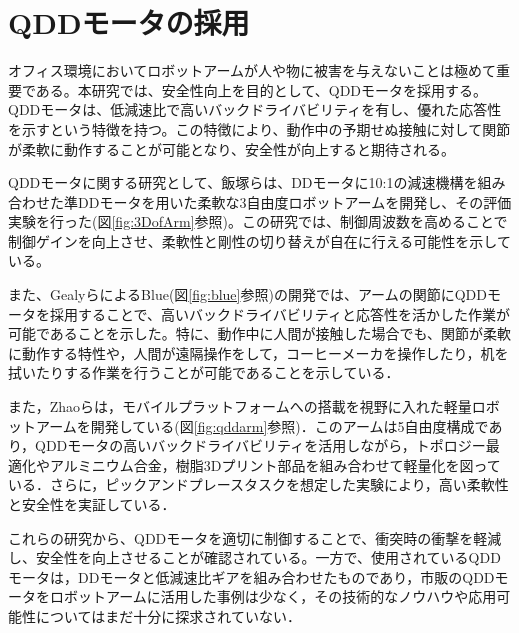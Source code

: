 
\section{QDDモータの採用}
オフィス環境においてロボットアームが人や物に被害を与えないことは極めて重要である。本研究では、安全性向上を目的として、QDDモータを採用する。QDDモータは、低減速比で高いバックドライバビリティを有し、優れた応答性を示すという特徴を持つ。この特徴により、動作中の予期せぬ接触に対して関節が柔軟に動作することが可能となり、安全性が向上すると期待される。

QDDモータに関する研究として、飯塚ら\cite{飯塚浩太2021}は、DDモータに10:1の減速機構を組み合わせた準DDモータを用いた柔軟な3自由度ロボットアームを開発し、その評価実験を行った(図\ref{fig:3DofArm}参照)。この研究では、制御周波数を高めることで制御ゲインを向上させ、柔軟性と剛性の切り替えが自在に行える可能性を示している。

また、Gealyら\cite{gealy2019}によるBlue(図\ref{fig:blue}参照)の開発では、アームの関節にQDDモータを採用することで、高いバックドライバビリティと応答性を活かした作業が可能であることを示した。特に、動作中に人間が接触した場合でも、関節が柔軟に動作する特性や，人間が遠隔操作をして，コーヒーメーカを操作したり，机を拭いたりする作業を行うことが可能であることを示している\cite{Blue:online}．

また，Zhaoら\cite{10106520}は，モバイルプラットフォームへの搭載を視野に入れた軽量ロボットアームを開発している(図\ref{fig:qddarm}参照)．このアームは5自由度構成であり，QDDモータの高いバックドライバビリティを活用しながら，トポロジー最適化やアルミニウム合金，樹脂3Dプリント部品を組み合わせて軽量化を図っている．さらに，ピックアンドプレースタスクを想定した実験により，高い柔軟性と安全性を実証している．

これらの研究から、QDDモータを適切に制御することで、衝突時の衝撃を軽減し、安全性を向上させることが確認されている。一方で、使用されているQDDモータは，DDモータと低減速比ギアを組み合わせたものであり，市販のQDDモータをロボットアームに活用した事例は少なく，その技術的なノウハウや応用可能性についてはまだ十分に探求されていない．

